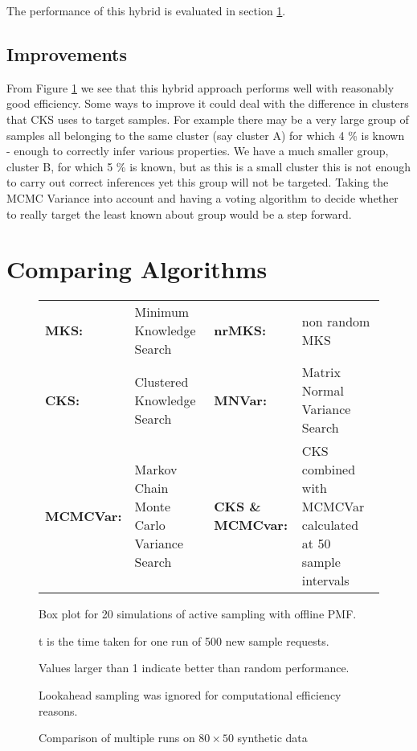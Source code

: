 The performance of this hybrid is evaluated in section \ref{sec:algo_comp}.

\subsection{Improvements}\label{sec:cks_mcmc_imp}

From Figure \ref{fig:combined_compared} we see that this hybrid approach performs well with reasonably good efficiency. Some ways to improve it could deal with the difference in clusters that CKS uses to target samples. For example there may be a very large group of samples all belonging to the same cluster (say cluster A) for which 4 \% is known -  enough to correctly infer various properties.  We have a much smaller group, cluster B, for which 5 \% is known, but as this is a small cluster this is not enough to carry out correct inferences yet this group will not be targeted. Taking the MCMC Variance into account and having a voting algorithm to decide whether to really target the least known about group would be a step forward.

\section{Comparing Algorithms}\label{sec:algo_comp}

\begin{figure}[!htbp]
  \begin{center}
    \resizebox{\textwidth}{!}{}
  \end{center}

  
  \begin{tabular}{p{2.2cm}p{5cm}p{2.2cm}p{5cm}}
  \textbf{MKS:} & Minimum Knowledge Search & \textbf{nrMKS:} & non random MKS \\
  \textbf{CKS:} & Clustered Knowledge Search & \textbf{MNVar:} & Matrix Normal Variance Search \\
  \textbf{MCMCVar:} & Markov Chain Monte Carlo Variance Search & \textbf{CKS \& MCMCvar:} & CKS combined with MCMCVar calculated at 50 sample intervals
  \end{tabular}
  
    Box plot for 20 simulations of active sampling with offline PMF.
  
  t is the time taken for one run of 500 new sample requests.
  
  Values larger than 1 indicate better than random performance.
  
  Lookahead sampling was ignored for computational efficiency reasons.
  
    \caption{Comparison of multiple runs on $80 \times 50$ synthetic data}
    \label{fig:combined_compared}
\end{figure}

